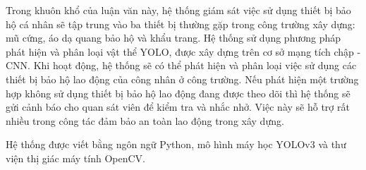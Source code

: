 \documentclass[12pt]{report}
\begin{document}
Trong khuôn khổ của luận văn này, hệ thống giám sát việc sử dụng thiết bị bảo hộ cá nhân 
sẽ tập trung vào ba thiết bị thường gặp trong công trường xây dựng: mũ cứng, áo dạ quang 
bảo hộ và khẩu trang. Hệ thống sử dụng phương pháp phát hiện và phân loại vật thể YOLO, 
được xây dựng trên cơ sở mạng tích chập - CNN. Khi hoạt động, hệ thống sẽ có thể phát hiện 
và phân loại việc sử dụng các thiết bị bảo hộ lao động của công nhân ở công trường. Nếu phát 
hiện một trường hợp không sử dụng thiết bị bảo hộ lao động đang được theo dõi thì hệ thống 
sẽ gửi cảnh báo cho quan sát viên để kiểm tra và nhắc nhở. Việc này sẽ hỗ trợ rất nhiều trong 
công tác đảm bảo an toàn lao động trong xây dựng.

Hệ thống được viết bằng ngôn ngữ Python, mô hình máy học YOLOv3 và thư viện thị giác máy tính 
OpenCV.

\clearpage    
{
\pagestyle{empty}
\tableofcontents
\clearpage
\listoffigures
\clearpage
\listoftables
\clearpage
}

%
{
\pagestyle{fancy}
\newpage\cleardoublepage
\newpage\cleardoublepage
\newpage\cleardoublepage
\newpage\cleardoublepage
\newpage\cleardoublepage

\nocite{*}
\newpage\cleardoublepage

}
\end{document}
